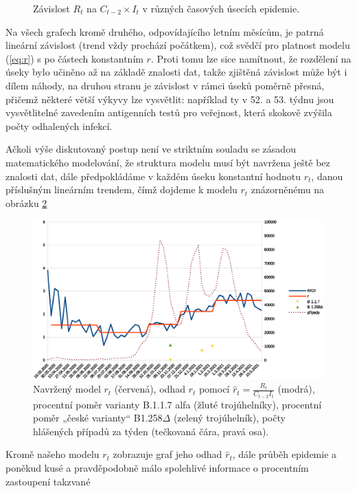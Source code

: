\begin{figure}
\begin{center}
\caption{Závislost $R_t$ na $C_{t-2} \times I_t$ v různých časových úsecích epidemie.}
\label{fig:xy5}
\end{center}
\end{figure}
Na všech grafech kromě druhého, odpovídajícího letním měsícům, je patrná lineární závislost (trend
vždy prochází počátkem), což svědčí pro platnost
modelu (\ref{eq:r}) s po částech konstantním $r$. Proti tomu lze sice namítnout,
že rozdělení na úseky bylo učiněno až na základě znalosti dat, takže zjištěná závislost může být i dílem náhody, na druhou stranu je závislost v rámci úseků poměrně přesná, přičemž některé větší výkyvy lze vysvětlit: například ty v 52. a 53.
týdnu jsou vysvětlitelné zavedením antigenních testů pro veřejnost,
která skokově zvýšila počty odhalených infekcí. 

Ačkoli výše diskutovaný postup není ve striktním souladu se zásadou matematického modelování, že struktura modelu musí být navržena ještě bez znalosti dat, dále předpokládáme v každém úseku konstantní hodnotu $r_{t}$,
danou příslušným lineárním trendem, čímž dojdeme k modelu $r_{t}$ znázorněnému na obrázku \ref{fig:model}
\begin{figure}
\begin{center}
\includegraphics[scale=0.4]{pic/whole}
\caption{Navržený model $r_t$ (červená), odhad $r_t$ pomocí $\hat{r}_t = \frac{R_{t}}{C_{t-2}I_{t}}$ (modrá), procentní poměr varianty B.1.1.7 alfa (žluté trojúhelníky), procentní poměr „české varianty“ B1.258$\Delta$ (zelený trojúhelník), počty hlášených případů za týden (tečkovaná čára, pravá osa).}
\label{fig:model}
\end{center}
\end{figure}
Kromě našeho modelu $r_t$ zobrazuje graf jeho odhad $\hat r_t$, dále průběh epidemie a poněkud kusé a pravděpodobně málo spolehlivé informace o procentním zastoupení takzvané
